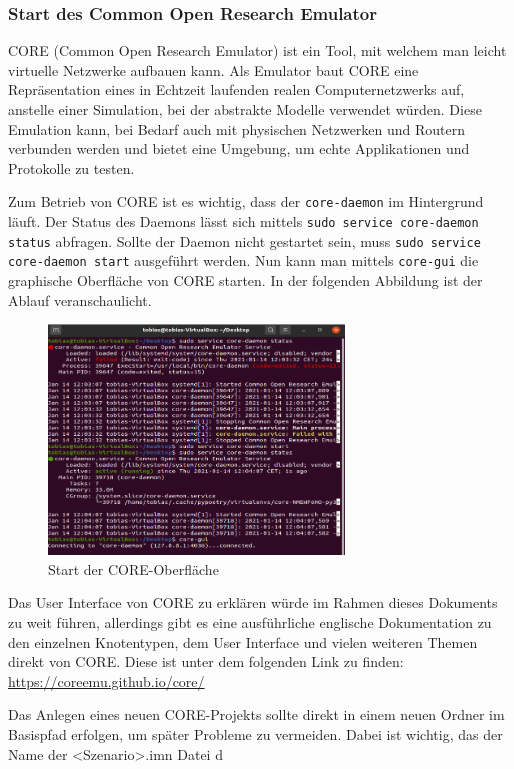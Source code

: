 \documentclass{article}
\begin{document}
\subsubsection{Start des Common Open Research Emulator}
CORE (Common Open Research Emulator) ist ein Tool, mit welchem man leicht virtuelle Netzwerke aufbauen kann. Als Emulator baut CORE eine Repräsentation eines in Echtzeit laufenden realen Computernetzwerks auf, anstelle einer Simulation, bei der abstrakte Modelle verwendet würden. Diese Emulation kann, bei Bedarf auch mit physischen Netzwerken und Routern verbunden werden und bietet eine Umgebung, um echte Applikationen und Protokolle zu testen.\cite{core-docs} \par
Zum Betrieb von CORE ist es wichtig, dass der \texttt{core-daemon} im Hintergrund läuft. Der Status des Daemons lässt sich mittels \texttt{sudo service core-daemon status} abfragen. Sollte der Daemon nicht gestartet sein, muss \texttt{sudo service core-daemon start} ausgeführt werden. Nun kann man mittels \texttt{core-gui} die graphische Oberfläche von CORE starten. In der folgenden Abbildung ist der Ablauf veranschaulicht.\par
\begin{figure}[ht]
\centering
\includegraphics[width=0.7\textwidth]{core-start}
\caption{Start der CORE-Oberfläche}
\end{figure}
Das User Interface von CORE zu erklären würde im Rahmen dieses Dokuments zu weit führen, allerdings gibt es eine ausführliche englische Dokumentation zu den einzelnen Knotentypen, dem User Interface und vielen weiteren Themen direkt von CORE. Diese ist unter dem folgenden Link zu finden: \url{https://coreemu.github.io/core/}\par
Das Anlegen eines neuen CORE-Projekts sollte direkt in einem neuen Ordner im Basispfad erfolgen, um später Probleme zu vermeiden. Dabei ist wichtig, das der Name der <Szenario>.imn Datei d\par
\end{document}
